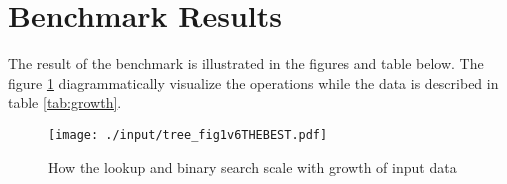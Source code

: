 \documentclass[a4paper, 11pt]{article}
\begin{document}
    
    

   \clearpage 
    \section*{Benchmark Results}
    \label{sec:results}
    The result of the benchmark is illustrated in the figures and table below.
    The figure \ref{fig:fig1} diagrammatically visualize the operations while the
    data is described in table \ref{tab:growth}.
    
    \begin{figure}[h]
        \centering
        \texttt{[image: ./input/tree\_fig1v6THEBEST.pdf]}
        \caption{How the lookup and binary search scale with growth of input data}
        \label{fig:fig1}
    \end{figure}

\end{document}
